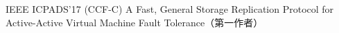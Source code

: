 \cvpub
{IEEE ICPADS'17 (CCF-C)} %
{A Fast, General Storage Replication Protocol for Active-Active Virtual Machine Fault  Tolerance（第一作者）} %
{} %
{} %
{ %
}
